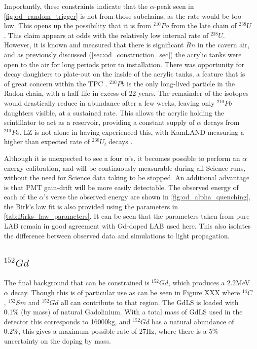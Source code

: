 \par
Importantly, these constraints indicate that the $\alpha$-peak seen in \autoref{fig:od_random_trigger} is not from those subchains, as the rate would be too low.
This opens up the possibility that it is from ${}^{210}Po$ from the late chain of ${}^{238}U$.
This claim appears at odds with the relatively low internal rate of ${}^{238}U$.
However, it is known and measured that there is significant $Rn$ in the cavern air, and as previously discussed (\autoref{sec:od_construction_sec}) the acrylic tanks were open to the air for long periods prior to installation.
There was opportunity for decay daughters to plate-out on the inside of the acrylic tanks, a feature that is of great concern within the TPC \cite{radon_plateout_ref}.
${}^{210}Pb$ is the only long-lived particle in the Radon chain, with a half-life in excess of 22-years. 
The remainder of the isotopes would drastically reduce in abundance after a few weeks, leaving only ${}^{210}Pb$ daughters visible, at a sustained rate.
This allows the acrylic holding the scintillator to act as a reservoir, providing a constant supply of $\alpha$ decays from ${}^{210}Po$.
LZ is not alone in having experienced this, with KamLAND measuring a higher than expected rate of ${}^{238}U_l$ decays \cite{KamLAND_LS_contaminants_ref}.

\par
Although it is unexpected to see a four $\alpha$'s, it becomes possible to perform an $\alpha$ energy calibration, and will be continuously measurable during all Science runs, without the need for Science data taking to be stopped.
An additional advantage is that PMT gain-drift will be more easily detectable.
The observed energy of each of the $\alpha$'s verse the observed energy are shown in \autoref{fig:od_alpha_quenching}, the Birk's law fit is also provided using the parameters in \autoref{tab:Birks_law_parameters}.
It can be seen that the parameters taken from pure LAB remain in good agreement with Gd-doped LAB used here.
This also isolates the difference between observed data and simulations to light propagation.



\subsection{${}^{152}Gd$}
\par
The final background that can be constrained is ${}^{152}Gd$, which produces a 2.2MeV $\alpha$ decay.
Though this is of particular use as can be seen in Figure XXX where ${}^{14}C$, ${}^{152}Sm$ and ${}^{152}Gd$ all can contribute to that region.
The GdLS is loaded with 0.1\% (by mass) of natural Gadolinium.
With a total mass of GdLS used in the detector this corresponds to 16000kg, and ${}^{152}Gd$ has a natural abundance of 0.2\%, this gives a maximum possible rate of 27Hz, where there is a 5\% uncertainty on the doping by mass.

